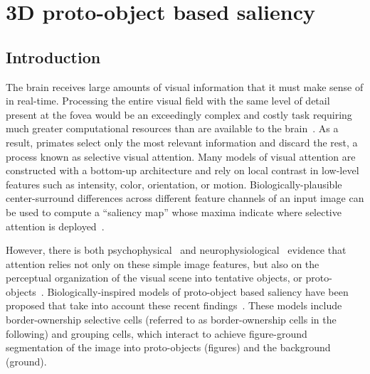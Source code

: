 \chapter{3D proto-object based saliency}
\label{sec:saliency}

\section{Introduction}
The brain receives large amounts of visual information that it must make sense of in real-time. Processing the entire visual field with the same level of detail present at the fovea would be an exceedingly complex and costly task requiring much greater computational resources than are available to the brain~\citep{Tsotsos90}. As a result, primates select only the most relevant information and discard the rest, a process known as selective visual attention.
%
%
Many models of visual attention are constructed with a bottom-up architecture and rely on local contrast in low-level features such as intensity, color, orientation, or motion. Biologically-plausible center-surround differences across different feature channels of an input image can be used to compute a ``saliency map'' whose maxima indicate where selective attention is deployed~\citep{Koch_Ullman85,Niebur_Koch96b,Itti_etal98a}.

However, there is both psychophysical~\citep{Einhauser_etal08a} and neurophysiological~\citep{Zhou_etal00, Qiu_etal07} evidence that attention relies not only on these simple image features, but also on the perceptual organization of the visual scene into tentative objects, or proto-objects~\citep{Rensink00a}. Biologically-inspired models of proto-object based saliency have been proposed that take into account these recent findings~\citep{Craft_etal07,Mihalas_etal11b,Russell_etal14}. These models include border-ownership selective cells (referred to as border-ownership cells in the following) and grouping cells, which interact to achieve figure-ground segmentation of the image into proto-objects (figures) and the background (ground).

